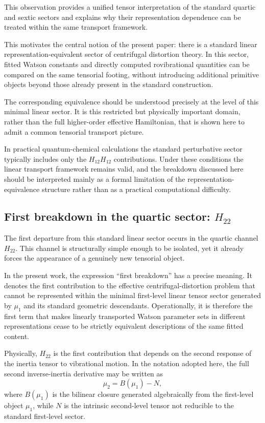This observation provides a unified tensor interpretation of the
standard quartic and sextic sectors and explains why their
representation dependence can be treated within the same transport
framework.

This motivates the central notion of the present paper: there is a
standard linear representation-equivalent sector of centrifugal
distortion theory. In this sector, fitted Watson constants and
directly computed rovibrational quantities can be compared on the same
tensorial footing, without introducing additional primitive objects
beyond those already present in the standard construction.

The corresponding equivalence should be understood precisely at the
level of this minimal linear sector. It is this restricted but
physically important domain, rather than the full higher-order
effective Hamiltonian, that is shown here to admit a common tensorial
transport picture.

In practical quantum-chemical calculations the standard perturbative
sector typically includes only the $H_{12}H_{12}$ contributions. Under
these conditions the linear transport framework remains valid, and the
breakdown discussed here should be interpreted mainly as a formal
limitation of the representation-equivalence structure rather than as a
practical computational difficulty.

\subsection{First breakdown in the quartic sector: \texorpdfstring{$H_{22}$}{H22}}

The first departure from this standard linear sector occurs in the
quartic channel $H_{22}$. This channel is structurally simple enough
to be isolated, yet it already forces the appearance of a genuinely
new tensorial object.

In the present work, the expression ``first breakdown'' has a precise
meaning. It denotes the first contribution to the effective
centrifugal-distortion problem that cannot be represented within the
minimal first-level linear tensor sector generated by $\mu_1$ and its
standard geometric descendants. Operationally, it is therefore the
first term that makes linearly transported Watson parameter sets in
different representations cease to be strictly equivalent descriptions
of the same fitted content.

Physically, $H_{22}$ is the first contribution that depends on the
second response of the inertia tensor to vibrational motion. In the
notation adopted here, the full second inverse-inertia derivative may
be written as
\begin{equation}
\mu_2 = B(\mu_1) - N,
\end{equation}
where $B(\mu_1)$ is the bilinear closure generated algebraically from
the first-level object $\mu_1$, while $N$ is the intrinsic second-level
tensor not reducible to the standard first-level sector.


